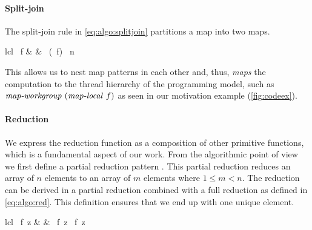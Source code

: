\paragraph{Split-join}
The split-join rule in \autoref{eq:algo:splitjoin} partitions a map into two maps.
%
\begin{rerule}{lcl}
  \map\ f
    & \rightarrow &
      \join \circ \map\ (\map\ f) \circ \splitN\ n
  \label{eq:algo:splitjoin}
\end{rerule}
%
This allows us to nest map patterns in each other and, thus, \emph{maps} the computation to the thread hierarchy of the \OpenCL programming model, such as $\mapWorkgroup\ (\mapLocal\ f)$ as seen in our motivation example (\autoref{fig:codeex}).


\paragraph{Reduction}
We express the reduction function as a composition of other primitive functions, which is a fundamental aspect of our work.
From the algorithmic point of view we first define a partial reduction pattern \partRed.
This partial reduction reduces an array of $n$ elements to an array of $m$ elements where $1 \leq m < n$.
The reduction can be derived in a partial reduction combined with a full reduction as defined in \autoref{eq:algo:red}.
This definition ensures that we end up with one unique element.
%
\begin{rerule}{lcl}
  \reduce\ f\ z
    & \rightarrow &
      \reduce\ f\ z \circ \partRed\ f\ z
  \label{eq:algo:red}
\end{rerule}

